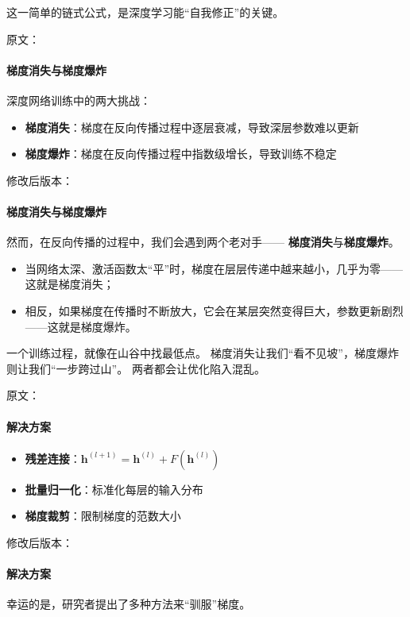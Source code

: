 这一简单的链式公式，是深度学习能“自我修正”的关键。



原文：
\paragraph{梯度消失与梯度爆炸}
深度网络训练中的两大挑战：

\begin{itemize}
\item \textbf{梯度消失}：梯度在反向传播过程中逐层衰减，导致深层参数难以更新
\item \textbf{梯度爆炸}：梯度在反向传播过程中指数级增长，导致训练不稳定
\end{itemize}
修改后版本：
\paragraph{梯度消失与梯度爆炸}  
然而，在反向传播的过程中，我们会遇到两个老对手——  
\textbf{梯度消失}与\textbf{梯度爆炸}。

\begin{itemize}
\item 当网络太深、激活函数太“平”时，梯度在层层传递中越来越小，几乎为零——这就是梯度消失；
\item 相反，如果梯度在传播时不断放大，它会在某层突然变得巨大，参数更新剧烈——这就是梯度爆炸。
\end{itemize}

一个训练过程，就像在山谷中找最低点。  
梯度消失让我们“看不见坡”，梯度爆炸则让我们“一步跨过山”。  
两者都会让优化陷入混乱。



原文：
\paragraph{解决方案}
\begin{itemize}
\item \textbf{残差连接}：$\mathbf{h}^{(l+1)} = \mathbf{h}^{(l)} + F(\mathbf{h}^{(l)})$
\item \textbf{批量归一化}：标准化每层的输入分布
\item \textbf{梯度裁剪}：限制梯度的范数大小
\end{itemize}
修改后版本：
\paragraph{解决方案}  
幸运的是，研究者提出了多种方法来“驯服”梯度。  

